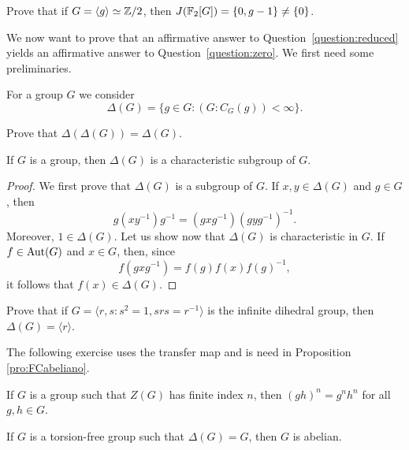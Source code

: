 \begin{exercise}
	Prove that if $G=\langle g\rangle\simeq\mathbb{Z}/2$, then 
	$J(\mathbb{F}_2[G])=\{0,g-1\}\ne\{0\}$. 
\end{exercise}


We now want to prove that an affirmative answer to 
Question~\ref{question:reduced} yields an affirmative answer to Question~\ref{question:zero}. We first need some preliminaries. 

For a group $G$ we consider
\[
        \Delta(G)=\{g\in G:(G:C_G(g))<\infty\}.
\]

\begin{exercise}
    Prove that $\Delta(\Delta(G))=\Delta(G)$.
\end{exercise}

\begin{proposition}
    If $G$ is a group, then $\Delta(G)$
    is a characteristic subgroup of $G$.
\end{proposition}

\begin{proof}
        We first prove that $\Delta(G)$ is a subgroup of $G$. If $x,y\in\Delta(G)$
        and $g\in G$, then 
        \[
        g(xy^{-1})g^{-1}=(gxg^{-1})(gyg^{-1})^{-1}.
        \]
        Moreover,
        $1\in\Delta(G)$. Let us show now that $\Delta(G)$ is characteristic in $G$. If
        $f\in\operatorname{Aut}(G)$ and $x\in G$, then, since
        \[
        f(gxg^{-1})=f(g)f(x)f(g)^{-1},
        \]
        it follows that $f(x)\in\Delta(G)$.
\end{proof}


\begin{exercise}
        Prove that if $G=\langle r,s:s^2=1,srs=r^{-1}\rangle$ is the
        infinite dihedral group, then $\Delta(G)=\langle r\rangle$.
\end{exercise}

The following exercise uses the transfer map and
is need 
in Proposition \ref{pro:FCabeliano}. 

\begin{exercise}
        \label{xca:center}
        If $G$ is a group such that $Z(G)$ has finite index $n$, then
        $(gh)^n=g^nh^n$ for all $g,h\in G$.
\end{exercise}

\begin{proposition}
	\label{pro:FCabeliano}
	If $G$ is a torsion-free group such 
	that $\Delta(G)=G$, then $G$ is abelian.
\end{proposition}

